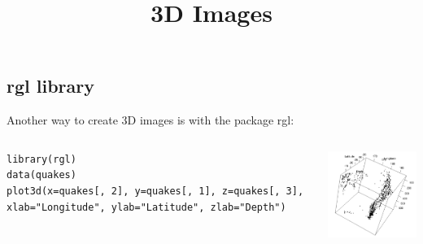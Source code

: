 \subsection{\ttfamily rgl \normalfont library} 
\begin{frame}[fragile]
\title{3D Images}

Another way to create 3D images is with the package \ttfamily rgl: \normalfont 

    \begin{columns}
\begin{lstlisting}
library(rgl)
data(quakes)
plot3d(x=quakes[, 2], y=quakes[, 1], z=quakes[, 3], xlab="Longitude", ylab="Latitude", zlab="Depth")
\end{lstlisting}

       \begin{center}
\includegraphics[width = 55mm]{images/Fiji_RGL}
\end{center}
\end{columns}
\end{frame}


